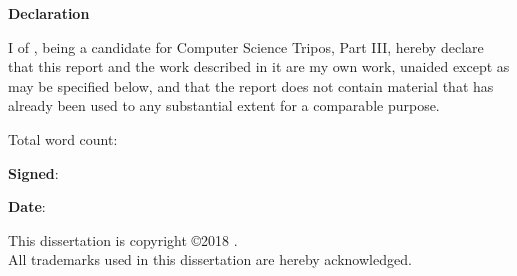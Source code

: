 \newpage
{\normalfont\Huge\sffamily\bfseries Declaration}

\vspace{24pt} 

I \authorname of \authorcollege, being a candidate for Computer Science Tripos,
Part III, hereby declare that this report and the work described in it are my
own work, unaided except as may be specified below, and that the report does
not contain material that has already been used to any substantial extent for a
comparable purpose.

\vspace{24pt}
Total word count: \wordcount

\vspace{60pt}
\textbf{Signed}: 

\vspace{12pt}
\textbf{Date}:

\vfill

This dissertation is copyright \copyright 2018 \authorname. 
\\
All trademarks used in this dissertation are hereby acknowledged.

\cleardoublepage%
